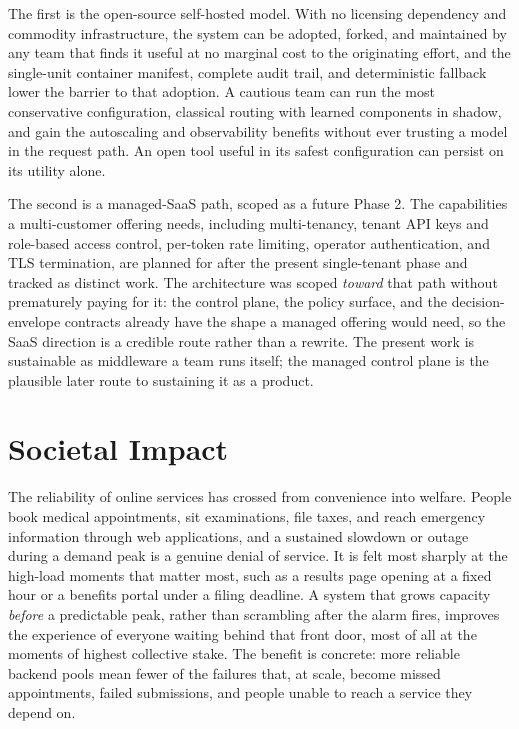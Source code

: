The first is the open-source self-hosted model. With no licensing dependency and
commodity infrastructure, the system can be adopted, forked, and maintained by any team
that finds it useful at no marginal cost to the originating effort, and the single-unit
container manifest, complete audit trail, and deterministic fallback lower the barrier
to that adoption. A cautious team can run the most conservative configuration, classical
routing with learned components in shadow, and gain the autoscaling and observability
benefits without ever trusting a model in the request path. An open tool useful in its
safest configuration can persist on its utility alone.

The second is a managed-SaaS path, scoped as a future Phase 2. The capabilities a
multi-customer offering needs, including multi-tenancy, tenant API keys and role-based
access control, per-token rate limiting, operator authentication, and TLS termination,
are planned for after the present single-tenant phase and tracked as distinct work. The
architecture was scoped \emph{toward} that path without prematurely paying for it: the
control plane, the policy surface, and the decision-envelope contracts already have the
shape a managed offering would need, so the SaaS direction is a credible route rather
than a rewrite. The present work is sustainable as middleware a team runs itself; the
managed control plane is the plausible later route to sustaining it as a product.

\section{Societal Impact}
\label{disc:societal}

The reliability of online services has crossed from convenience into welfare. People
book medical appointments, sit examinations, file taxes, and reach emergency
information through web applications, and a sustained slowdown or outage during a demand
peak is a genuine denial of service. It is felt most sharply at the high-load moments
that matter most, such as a results page opening at a fixed hour or a benefits portal
under a filing deadline. A system that grows capacity \emph{before} a predictable peak,
rather than scrambling after the alarm fires, improves the experience of everyone
waiting behind that front door, most of all at the moments of highest collective stake.
The benefit is concrete: more reliable backend pools mean fewer of the failures that,
at scale, become missed appointments, failed submissions, and people unable to reach a
service they depend on.

